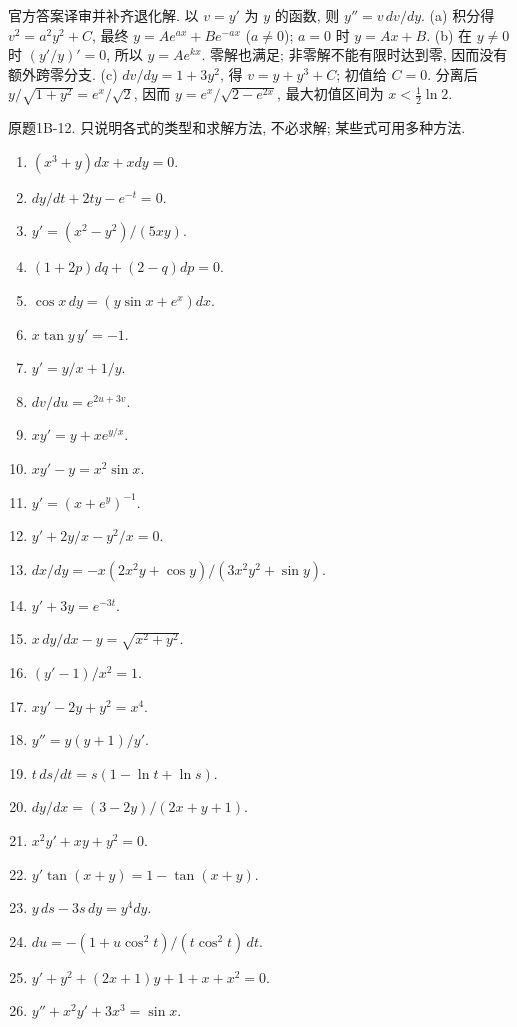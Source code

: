 \begin{solution}
官方答案译审并补齐退化解. 以 $v=y'$ 为 $y$ 的函数, 则 $y''=v\,dv/dy$. (a) 积分得 $v^2=a^2y^2+C$, 最终 $y=Ae^{ax}+Be^{-ax}$ ($a\ne0$); $a=0$ 时 $y=Ax+B$. (b) 在 $y\ne0$ 时 $(y'/y)'=0$, 所以 $y=Ae^{kx}$. 零解也满足; 非零解不能有限时达到零, 因而没有额外跨零分支. (c) $dv/dy=1+3y^2$, 得 $v=y+y^3+C$; 初值给 $C=0$. 分离后 $y/\sqrt{1+y^2}=e^x/\sqrt2$, 因而 $y=e^x/\sqrt{2-e^{2x}}$, 最大初值区间为 $x<\frac12\ln2$.
\end{solution}
\begin{exercise}\label{cw:bank-1B-12}
原题1B-12. 只说明各式的类型和求解方法, 不必求解; 某些式可用多种方法.
\begin{enumerate}[label=\arabic*.]
\item $(x^3+y)dx+xdy=0$. \item $dy/dt+2ty-e^{-t}=0$.
\item $y'=(x^2-y^2)/(5xy)$. \item $(1+2p)dq+(2-q)dp=0$.
\item $\cos x\,dy=(y\sin x+e^x)dx$. \item $x\tan y\,y'=-1$.
\item $y'=y/x+1/y$. \item $dv/du=e^{2u+3v}$.
\item $xy'=y+xe^{y/x}$. \item $xy'-y=x^2\sin x$.
\item $y'=(x+e^y)^{-1}$. \item $y'+2y/x-y^2/x=0$.
\item $dx/dy=-x(2x^2y+\cos y)/(3x^2y^2+\sin y)$.
\item $y'+3y=e^{-3t}$. \item $x\,dy/dx-y=\sqrt{x^2+y^2}$.
\item $(y'-1)/x^2=1$. \item $xy'-2y+y^2=x^4$.
\item $y''=y(y+1)/y'$. \item $t\,ds/dt=s(1-\ln t+\ln s)$.
\item $dy/dx=(3-2y)/(2x+y+1)$. \item $x^2y'+xy+y^2=0$.
\item $y'\tan(x+y)=1-\tan(x+y)$. \item $y\,ds-3s\,dy=y^4dy$.
\item $du=-(1+u\cos^2t)/(t\cos^2t)\,dt$.
\item $y'+y^2+(2x+1)y+1+x+x^2=0$. \item $y''+x^2y'+3x^3=\sin x$.
\end{enumerate}
\end{exercise}
